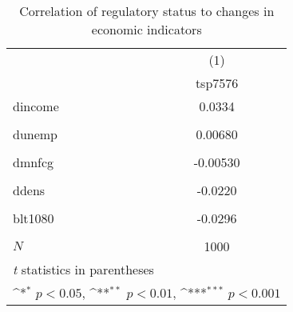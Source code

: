 \begin{table}[htbp]\centering
\def\sym#1{\ifmmode^{#1}\else\(^{#1}\)\fi}
\caption{Correlation of regulatory status to changes in economic indicators\label{IIb3}}
\begin{tabular}{l*{1}{c}}
\hline\hline
            &\multicolumn{1}{c}{(1)}\\
            &\multicolumn{1}{c}{tsp7576}\\
\hline
dincome     &      0.0334         \\
            &                     \\
[1em]
dunemp      &     0.00680         \\
            &                     \\
[1em]
dmnfcg      &    -0.00530         \\
            &                     \\
[1em]
ddens       &     -0.0220         \\
            &                     \\
[1em]
blt1080     &     -0.0296         \\
            &                     \\
\hline
\(N\)       &        1000         \\
\hline\hline
\multicolumn{2}{l}{\footnotesize \textit{t} statistics in parentheses}\\
\multicolumn{2}{l}{\footnotesize \sym{*} \(p<0.05\), \sym{**} \(p<0.01\), \sym{***} \(p<0.001\)}\\
\end{tabular}
\end{table}
